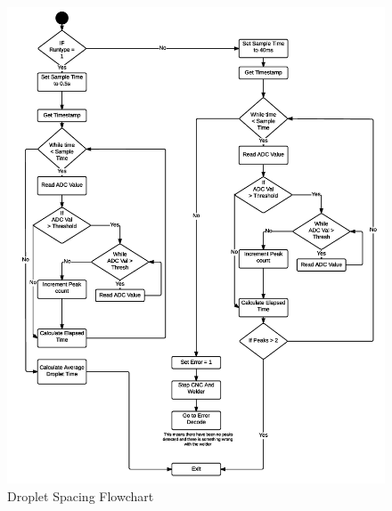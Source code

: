 \documentclass[12pt]{article}
\begin{document}
\clearpage


\begin{figure}[!h]
\centering
\includegraphics[scale=0.85]{dropletspacing}
\caption{Droplet Spacing Flowchart}
\end{figure}

\clearpage
\end{document}
